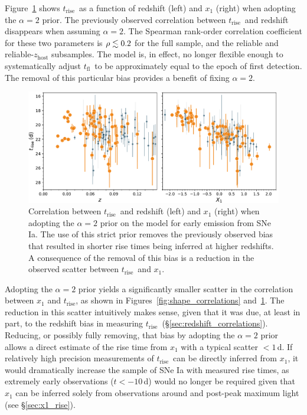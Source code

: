 \documentclass[twocolumn]{./aastex63}
\newcommand{\tfl}{$t_\mathrm{fl}$}
\newcommand{\trise}{$t_\mathrm{rise}$}
\begin{document}
Figure~\ref{fig:tsquared_z_evolution} shows \trise\ as a function of redshift
(left) and $x_1$ (right) when adopting the $\alpha = 2$ prior. The previously
observed correlation between \trise\ and redshift disappears when assuming
$\alpha = 2$. The Spearman rank-order correlation coefficient for these two
parameters is $\rho \lesssim 0.2$ for the full sample, and the reliable and
reliable-$z_\mathrm{host}$ subsamples. The model is, in effect, no longer
flexible enough to systematically adjust \tfl\ to be approximately equal to
the epoch of first detection. The removal of this particular bias provides a
benefit of fixing $\alpha = 2$.

\begin{figure}
    \centering
    \includegraphics[width=6in]{./figures/trise_z_tsquared.pdf}
    \caption{Correlation between \trise\ and redshift (left) and $x_1$ (right)
    when adopting the $\alpha = 2$ prior on the model for early emission from
    SNe Ia. The use of this strict prior removes the previously observed bias
    that resulted in shorter rise times being inferred at higher redshifts. A
    consequence of the removal of this bias is a reduction in the observed
    scatter between \trise\ and $x_1$.}
    \label{fig:tsquared_z_evolution}
\end{figure}


Adopting the $\alpha = 2$ prior yields a significantly smaller scatter in the
correlation between $x_1$ and \trise, as shown in
Figures~\ref{fig:shape_correlations} and~\ref{fig:tsquared_z_evolution}. The
reduction in this scatter intuitively makes sense, given that it was due, at
least in part, to the redshift bias in measuring \trise\
(\S\ref{sec:redshift_correlations}). Reducing, or possibly fully removing,
that bias by adopting the $\alpha = 2$ prior allows a direct estimate of the
rise time from $x_1$ with a typical scatter $< 1$\,d. If relatively high
precision measurements of \trise\ can be directly inferred from $x_1$, it
would dramatically increase the sample of SNe Ia with measured rise times, as
extremely early observations ($t < -10$\,d) would no longer be required given
that $x_1$ can be inferred solely from observations around and post-peak
maximum light (see \S\ref{sec:x1_rise}).
\end{document}
